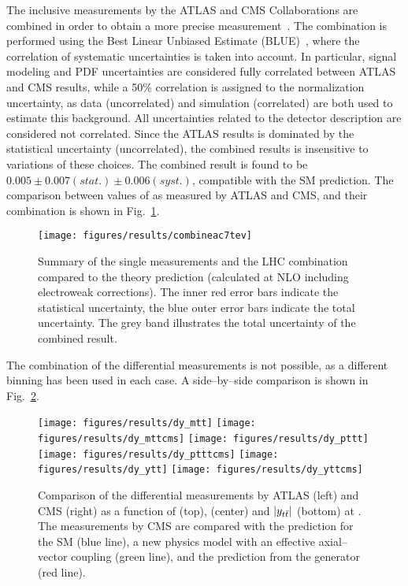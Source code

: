 The inclusive \ac{} measurements by the ATLAS and CMS Collaborations
are combined in order to obtain a more precise
measurement~\cite{ATLAS-CONF-2014-012}. 
The combination is performed using the Best Linear Unbiased Estimate
(BLUE)~\cite{Lyons:1988rp,Valassi:2003mu}, where the correlation of
systematic uncertainties is taken into account. In particular, signal
modeling and PDF uncertainties are considered fully correlated between
ATLAS and CMS results, while a 50\% correlation is assigned to the
\wjets{} normalization uncertainty, as data (uncorrelated) and
simulation (correlated) are both used to estimate this
background. All uncertainties related to the detector description
are considered not correlated. Since the ATLAS results is
dominated by the statistical uncertainty (uncorrelated), the combined
results is insensitive to variations of these choices. The combined
result is found to be $0.005\pm0.007(stat.)\pm0.006(syst.)$,
compatible with the SM prediction. The comparison between values of
\ac{} as measured by ATLAS and CMS, and their combination is shown in
Fig.~\ref{fig:combineac}.
\begin{figure}[!htb]\centering
  \texttt{[image: figures/results/combineac7tev]} 
  \caption{Summary of the single \ac{} measurements and the LHC
    combination compared to the theory prediction (calculated at NLO
    including electroweak corrections). The inner red error bars
    indicate the statistical uncertainty, the blue outer error bars
    indicate the total uncertainty. The grey band illustrates the
    total uncertainty of the combined result.} 
  \label{fig:combineac}
\end{figure}
The combination of the differential measurements is not possible, as a
different binning has been used in each case. A side--by--side
comparison is shown in Fig.~\ref{fig:comparediff7tev}. 

\begin{figure}[!htb]\centering
  \texttt{[image: figures/results/dy\_mtt]} 
  \texttt{[image: figures/results/dy\_mttcms]} 
  \texttt{[image: figures/results/dy\_pttt]} 
  \texttt{[image: figures/results/dy\_ptttcms]} 
  \texttt{[image: figures/results/dy\_ytt]} 
  \texttt{[image: figures/results/dy\_yttcms]} 
  \caption{Comparison of the differential \ac{} measurements by ATLAS
    (left) and CMS (right) as a function of \mtt{} (top), \pttt{}
    (center) and $|y_{t\bar{t}}{}|$ (bottom) at \seventev{}. The measurements
    by CMS are compared with the prediction for the SM (blue line), a
    new physics model with an
    effective axial--vector coupling (green line), and the prediction from
    the \powheg{} generator (red line).} 
  \label{fig:comparediff7tev}
\end{figure}

